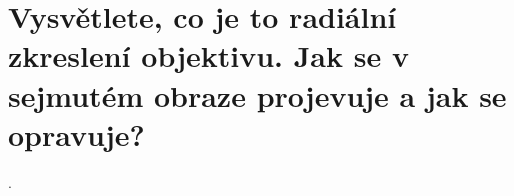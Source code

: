 \section{Vysvětlete, co je to radiální zkreslení objektivu. Jak se v sejmutém obraze projevuje a jak se opravuje?}.